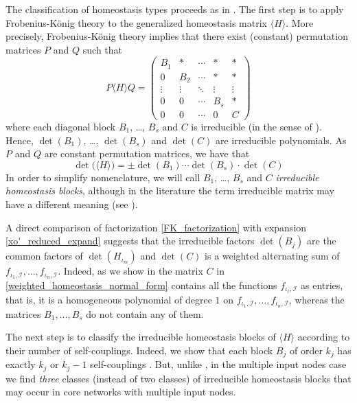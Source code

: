 \documentclass[a4paper,fleqn]{cas-dc}
\begin{document}
The classification of homeostasis types proceeds as in \cite{wang2021}. 
The first step is to apply Frobenius-K\"onig theory \cite{schneider1977,brualdi1991} to the generalized homeostasis matrix $\langle H \rangle$. 
More precisely, Frobenius-K\"onig theory implies that there exist (constant) permutation matrices $P$ and $Q$ such that
\begin{equation} \label{weighted_homeostasis_normal_form}
P \langle H \rangle Q = \begin{pmatrix} B_{1} & * & \cdots & * & * \\
0 & B_{2} & \cdots & * & * \\
\vdots & \vdots & \ddots & \vdots & \vdots \\
0 & 0 & \cdots & B_{s} & * \\
0 & 0 & \cdots & 0 & C
\end{pmatrix}
\end{equation}
where each diagonal block $B_{1}$, \ldots, $B_{s}$ and $C$ is irreducible (in the sense of \cite{brualdi1991}). 
Hence, $\det(B_{1})$, \ldots, $\det(B_{s})$ and $\det(C)$ are irreducible polynomials. 
As $P$ and $Q$ are constant permutation matrices, we have that
\begin{equation} \label{FK_factorization}
\det\!\big(\langle H \rangle\big) = \pm \det(B_{1}) \cdots \det(B_{s}) \cdot \det(C)
\end{equation}
In order to simplify nomenclature, we will call $B_{1}$, \ldots, $B_{s}$ and $C$ \emph{irreducible homeostasis blocks}, although in the literature the term irreducible matrix may have a different meaning (see \cite{schneider1977}).

A direct comparison of factorization \eqref{FK_factorization} with expansion 
\eqref{xo'_reduced_expand} suggests that the irreducible factors $\det(B_j)$ are the common factors of $\det(H_{\iota_m})$ and $\det(C)$ is a weighted alternating sum of $f_{\iota_{1},\mathcal{I}}, \ldots, f_{\iota_{n},\mathcal{I}}$. 
Indeed, as we show in \cite{madeira2022} the matrix $C$ in \eqref{weighted_homeostasis_normal_form} contains all the functions $f_{\iota_{\ell}, \mathcal{I}}$ as entries, that is, it is a homogeneous polynomial of degree $1$ on $f_{\iota_{1}, \mathcal{I}}, \ldots, f_{\iota_{n}, \mathcal{I}}$, whereas the matrices $B_{1}, \ldots, B_{s}$ do not contain any of them.

The next step is to classify the irreducible homeostasis blocks of $\langle H \rangle$ according to their number of self-couplings. 
Indeed, we show that each block $B_{j}$ of order $k_{j}$ has exactly $k_{j}$ or $k_{j}-1$ self-couplings \cite[Sec. 3.4]{madeira2022}. 
But, unlike \cite{wang2021}, in the multiple input nodes case we find \emph{three} classes (instead of two classes) of irreducible homeostasis blocks that may occur in core networks with multiple input nodes.
\end{document}
